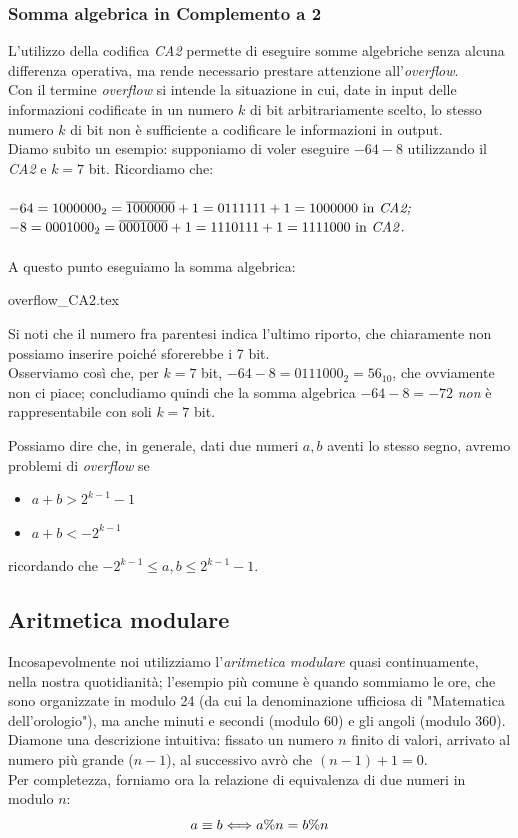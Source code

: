 \documentclass[class=book, crop=false]{standalone}
\begin{document}
\subsubsection{Somma algebrica in Complemento a 2} L'utilizzo della codifica \emph{CA2} permette di eseguire somme algebriche senza alcuna differenza operativa, ma rende necessario prestare attenzione all'\emph{overflow}.\\
Con il termine \emph{overflow} si intende la situazione in cui, date in input delle informazioni codificate in un numero $k$ di bit arbitrariamente scelto, lo stesso numero $k$ di bit non è sufficiente a codificare le informazioni in output. \\
Diamo subito un esempio: supponiamo di voler eseguire $-64-8$ utilizzando il \emph{CA2} e $k=7$ bit. Ricordiamo che:\\\\
$-64=1000000_{2}=\overline{1000000}+1=0111111+1=1000000 \text{ in \emph{CA2;}}$\\
$-8=0001000_{2}=\overline{0001000}+1=1110111+1=1111000 \text{ in \emph{CA2}}.$\\\\
A questo punto eseguiamo la somma algebrica:
\begin{table}[H]
	\centering
	{overflow_CA2.tex}
\end{table}
Si noti che il numero fra parentesi indica l'ultimo riporto, che chiaramente non possiamo inserire poiché sforerebbe i 7 bit.\\
Osserviamo così che, per $k=7$ bit, $-64-8=0111000_{2}=56_{10}$, che ovviamente non ci piace; concludiamo quindi che la somma algebrica $-64-8=-72$ \emph{non} è rappresentabile con soli $k=7$ bit.

Possiamo dire che, in generale, dati due numeri $a, b$ aventi lo stesso segno, avremo problemi di \emph{overflow} se
\begin{itemize}[noitemsep,nolistsep]
	\item $a+b>2^{k-1}-1$
	\item $a+b<-2^{k-1}$
\end{itemize}
ricordando che $-2^{k-1}\le a,b\le 2^{k-1}-1$.

\subsection{Aritmetica modulare} Incosapevolmente noi utilizziamo l'\emph{aritmetica modulare} quasi continuamente, nella nostra quotidianità; l'esempio più comune è quando sommiamo le ore, che sono organizzate in modulo 24 (da cui la denominazione ufficiosa di "Matematica dell'orologio"), ma anche minuti e secondi (modulo 60) e gli angoli (modulo 360).\\
Diamone una descrizione intuitiva: fissato un numero $n$ finito di valori, arrivato al numero più grande ($n-1$), al successivo avrò che $(n-1)+1=0$.\\
Per completezza, forniamo ora la relazione di equivalenza di due numeri in modulo $n$:
\begin{equation*}
\centering
a\equiv b \Longleftrightarrow a\%n=b\%n
\end{equation*}
\end{document}
